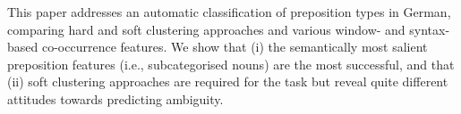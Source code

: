 This paper addresses an automatic classification of preposition types in German, comparing hard and soft clustering approaches and various window- and syntax-based co-occurrence features. We show that (i) the semantically most salient preposition features (i.e., subcategorised nouns) are the most successful, and that (ii) soft clustering approaches are required for the task but reveal quite different attitudes towards predicting ambiguity.
